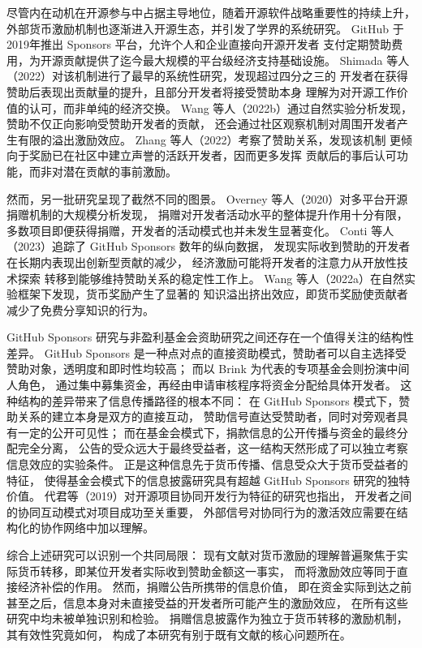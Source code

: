\documentclass[
    type = master, %
    degree = professional,        %
    decl-page,  %
    twoside,                %
    fontset = fandol %
  ]{njuthesis}
\begin{document}
尽管内在动机在开源参与中占据主导地位，随着开源软件战略重要性的持续上升，
外部货币激励机制也逐渐进入开源生态，并引发了学界的系统研究。
GitHub 于2019年推出 Sponsors 平台，允许个人和企业直接向开源开发者
支付定期赞助费用，为开源贡献提供了迄今最大规模的平台级经济支持基础设施。
Shimada 等人（2022）对该机制进行了最早的系统性研究，发现超过四分之三的
开发者在获得赞助后表现出贡献量的提升，且部分开发者将接受赞助本身
理解为对开源工作价值的认可，而非单纯的经济交换\cite{shimada2022github}。
Wang 等人（2022b）通过自然实验分析发现，赞助不仅正向影响受赞助开发者的贡献，
还会通过社区观察机制对周围开发者产生有限的溢出激励效应\cite{wang2022influence}。
Zhang 等人（2022）考察了赞助关系，发现该机制
更倾向于奖励已在社区中建立声誉的活跃开发者，因而更多发挥
贡献后的事后认可功能，而非对潜在贡献的事前激励\cite{zhang2022who}。

然而，另一批研究呈现了截然不同的图景。
Overney 等人（2020）对多平台开源捐赠机制的大规模分析发现，
捐赠对开发者活动水平的整体提升作用十分有限，
多数项目即便获得捐赠，开发者的活动模式也并未发生显著变化\cite{overney2020not}。
Conti 等人（2023）追踪了 GitHub Sponsors 数年的纵向数据，
发现实际收到赞助的开发者在长期内表现出创新型贡献的减少，
经济激励可能将开发者的注意力从开放性技术探索
转移到能够维持赞助关系的稳定性工作上\cite{conti2023incentivizing}。
Wang 等人（2022a）在自然实验框架下发现，货币奖励产生了显著的
知识溢出挤出效应，即货币奖励使贡献者减少了免费分享知识的行为\cite{wang2022monetary}。

GitHub Sponsors 研究与非盈利基金会资助研究之间还存在一个值得关注的结构性差异。
GitHub Sponsors 是一种点对点的直接资助模式，赞助者可以自主选择受赞助对象，透明度和即时性均较高；
而以 Brink 为代表的专项基金会则扮演中间人角色，
通过集中募集资金，再经由申请审核程序将资金分配给具体开发者。
这种结构的差异带来了信息传播路径的根本不同：
在 GitHub Sponsors 模式下，赞助关系的建立本身是双方的直接互动，
赞助信号直达受赞助者，同时对旁观者具有一定的公开可见性；
而在基金会模式下，捐款信息的公开传播与资金的最终分配完全分离，
公告的受众远大于最终受益者，这一结构天然形成了可以独立考察信息效应的实验条件。
正是这种信息先于货币传播、信息受众大于货币受益者的特征，
使得基金会模式下的信息披露研究具有超越 GitHub Sponsors 研究的独特价值。
代君等（2019）对开源项目协同开发行为特征的研究也指出，
开发者之间的协同互动模式对项目成功至关重要，
外部信号对协同行为的激活效应需要在结构化的协作网络中加以理解\cite{dai2019collaborative}。

综合上述研究可以识别一个共同局限：
现有文献对货币激励的理解普遍聚焦于实际货币转移，即某位开发者实际收到赞助金额这一事实，
而将激励效应等同于直接经济补偿的作用。
然而，捐赠公告所携带的信息价值，
即在资金实际到达之前甚至之后，信息本身对未直接受益的开发者所可能产生的激励效应，
在所有这些研究中均未被单独识别和检验。
捐赠信息披露作为独立于货币转移的激励机制，其有效性究竟如何，
构成了本研究有别于既有文献的核心问题所在。
\end{document}
